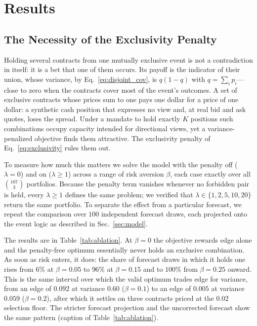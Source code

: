 \documentclass[aps, reprint, prl, twocolumn, superscriptaddress,amsmath,amssymb,noeprint]{revtex4-2}
\begin{document}
\section{Results}

\subsection{The Necessity of the Exclusivity Penalty}
\label{sec:ablation}

Holding several contracts from one mutually exclusive event is not a
contradiction in itself: it is a bet that one of them occurs.  Its payoff is
the indicator of their union, whose variance, by
Eq.~\eqref{eq:disjoint_cov}, is $q(1-q)$ with $q = \sum_i p_i$---close to zero
when the contracts cover most of the event's outcomes.  A set of exclusive
contracts whose prices sum to one pays one dollar for a price of one dollar: a
synthetic cash position that expresses no view and, at real bid and ask quotes,
loses the spread.  Under a mandate to hold exactly $K$ positions such
combinations occupy capacity intended for directional views, yet a
variance-penalized objective finds them attractive.  The exclusivity penalty
of Eq.~\eqref{eq:exclusivity} rules them out.

To measure how much this matters we solve the model with the penalty off
($\lambda = 0$) and on ($\lambda \ge 1$) across a range of risk aversion
$\beta$, each case exactly over all $\binom{167}{3}$ portfolios.  Because the
penalty term vanishes whenever no forbidden pair is held, every
$\lambda \ge 1$ defines the same problem; we verified that
$\lambda \in \{1, 2, 5, 10, 20\}$ return the same portfolio.  To separate the
effect from a particular forecast, we repeat the comparison over $100$
independent forecast draws, each projected onto the event logic as described
in Sec.~\ref{sec:model}.

The results are in Table~\ref{tab:ablation}.  At $\beta = 0$ the objective
rewards edge alone and the penalty-free optimum essentially never holds an
exclusive combination.  As soon as risk enters, it does: the share of forecast
draws in which it holds one rises from $6\%$ at $\beta = 0.05$ to $96\%$ at
$\beta = 0.15$ and to $100\%$ from $\beta = 0.25$ onward.  This is the same
interval over which the valid optimum trades edge for variance, from an edge of
$0.092$ at variance $0.60$ ($\beta = 0.1$) to an edge of $0.005$ at variance
$0.059$ ($\beta = 0.2$), after which it settles on three contracts priced at
the $0.02$ selection floor.  The stricter forecast projection and the
uncorrected forecast show the same pattern (caption of
Table~\ref{tab:ablation}).
\end{document}
